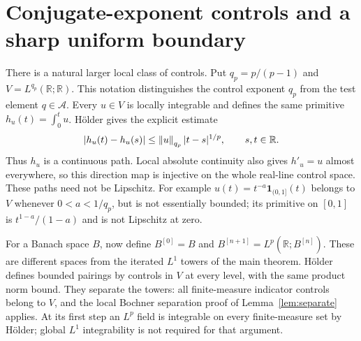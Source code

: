 \documentclass[11pt]{article}
\theoremstyle{remark}\newtheorem{remark}[theorem]{Remark}
\newcommand{\R}{\mathbb R}\newcommand{\C}{\mathbb C}
\newcommand{\A}{\mathcal A}\newcommand{\X}{\mathcal X}
\begin{document}
\section{Conjugate-exponent controls and a sharp uniform boundary}\label{sec:dual}
There is a natural larger local class of controls. Put $q_p=p/(p-1)$ and
$V=L^{q_p}(\R;\R)$. This notation distinguishes the control exponent
$q_p$ from the test element $q\in\A$. Every $u\in V$ is locally
integrable and defines the same primitive $h_u(t)=\int_0^tu$. H\"older
gives the explicit estimate
\[
 |h_u(t)-h_u(s)|\le\norm u_{q_p}|t-s|^{1/p},\qquad s,t\in\R.
\]
Thus $h_u$ is a continuous path. Local absolute continuity also gives
$h'_u=u$ almost everywhere, so this direction map is injective on the
whole real-line control space. These paths need not be Lipschitz. For
example $u(t)=t^{-a}\mathbf1_{(0,1]}(t)$ belongs to $V$ whenever
$0<a<1/q_p$, but is not essentially bounded; its primitive on $[0,1]$
is $t^{1-a}/(1-a)$ and is not Lipschitz at zero.

For a Banach space $B$, now define $B^{[0]}=B$ and
$B^{[n+1]}=L^p(\R;B^{[n]})$. These are different spaces from the
iterated $L^1$ towers of the main theorem. H\"older defines bounded
pairings by controls in $V$ at every level, with the same product
norm bound. They separate the towers: all finite-measure indicator
controls belong to $V$, and the local Bochner separation proof of
Lemma~\ref{lem:separate} applies. At its first step an $L^p$ field is
integrable on every finite-measure set by H\"older; global $L^1$
integrability is not required for that argument.
\end{document}
